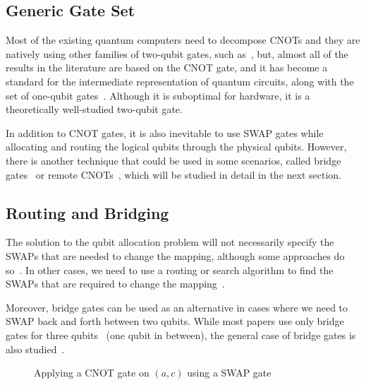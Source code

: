 \documentclass{report}
\begin{document}
\subsection{Generic Gate Set}

Most of the existing quantum computers need to decompose CNOTs and they are natively using other families of two-qubit gates, such as~\cite{foxen2020}, but, almost all of the results in the literature are based on the CNOT gate, and it has become a standard for the intermediate representation of quantum circuits, along with the set of one-qubit gates~\cite{zulehner2018,siraichi2018,li2019,zhang2021,zhou2020,itoko2019,murali2019,sivarajah2021}. Although it is suboptimal for hardware, it is a theoretically well-studied two-qubit gate.

In addition to CNOT gates, it is also inevitable to use SWAP gates while allocating and routing the logical qubits through the physical qubits. However, there is another technique that could be used in some scenarios, called bridge gates~\cite{sivarajah2021,itoko2019,shende2006,siraichi2018} or remote CNOTs~\cite{zhou2020, nash2020}, which will be studied in detail in the next section.

\subsection{Routing and Bridging}

The solution to the qubit allocation problem will not necessarily specify the SWAPs that are needed to change the mapping, although some approaches do so~\cite{childs, li2019, zhou2020}. In other cases, we need to use a routing or search algorithm to find the SWAPs that are required to change the mapping~\cite{zulehner2018, sivarajah2021}.

Moreover, bridge gates can be used as an alternative in cases where we need to SWAP back and forth between two qubits. While most papers use only bridge gates for three qubits~\cite{sivarajah2021,itoko2019,shende2006,siraichi2018} (one qubit in between), the general case of bridge gates is also studied~\cite{zhou2020, nash2020}.

\def\qceq{\midstick[3,brackets=none]{=}}

\begin{figure}[h]
  \label{fig:bridge-one-with-swap}
  \centering
{}
  \caption{Applying a CNOT gate on $(a, c)$ using a SWAP gate}
\end{figure}
\end{document}
